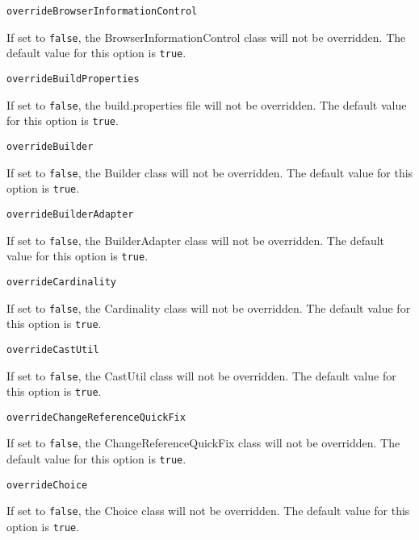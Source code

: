 \noindent\texttt{overrideBrowserInformationControl}
\begin{myindentpar}{1cm}
If set to \texttt{false}, the BrowserInformationControl class will not be overridden. The default value for this option is \texttt{true}.
\end{myindentpar}

\noindent\texttt{overrideBuildProperties}
\begin{myindentpar}{1cm}
If set to \texttt{false}, the build.properties file will not be overridden. The default value for this option is \texttt{true}.
\end{myindentpar}

\noindent\texttt{overrideBuilder}
\begin{myindentpar}{1cm}
If set to \texttt{false}, the Builder class will not be overridden. The default value for this option is \texttt{true}.
\end{myindentpar}

\noindent\texttt{overrideBuilderAdapter}
\begin{myindentpar}{1cm}
If set to \texttt{false}, the BuilderAdapter class will not be overridden. The default value for this option is \texttt{true}.
\end{myindentpar}

\noindent\texttt{overrideCardinality}
\begin{myindentpar}{1cm}
If set to \texttt{false}, the Cardinality class will not be overridden. The default value for this option is \texttt{true}.
\end{myindentpar}

\noindent\texttt{overrideCastUtil}
\begin{myindentpar}{1cm}
If set to \texttt{false}, the CastUtil class will not be overridden. The default value for this option is \texttt{true}.
\end{myindentpar}

\noindent\texttt{overrideChangeReferenceQuickFix}
\begin{myindentpar}{1cm}
If set to \texttt{false}, the ChangeReferenceQuickFix class will not be overridden. The default value for this option is \texttt{true}.
\end{myindentpar}

\noindent\texttt{overrideChoice}
\begin{myindentpar}{1cm}
If set to \texttt{false}, the Choice class will not be overridden. The default value for this option is \texttt{true}.
\end{myindentpar}

